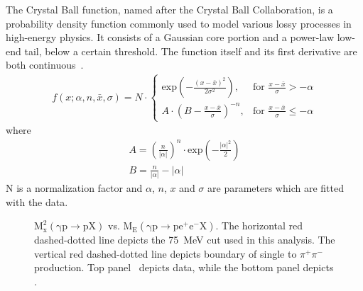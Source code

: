 The Crystal Ball function, named after the Crystal Ball Collaboration, is a probability density function commonly used to model various lossy processes in high-energy physics. It consists of a Gaussian core portion and a power-law low-end tail, below a certain threshold. The function itself and its first derivative are both continuous~\cite{CBjlab}. 
\begin{align}
f(x;\alpha,n,\bar{x},\sigma)=N\cdot
\begin{cases}
\mathrm{exp}(-\frac{(x-\bar{x})^2}{2 \sigma^2}), & \text{for }\frac{x-\bar{x}}{\sigma}>-\alpha \\
A \cdot (B - \frac{x-\bar{x}}{\sigma})^{-n}, & \text{for }\frac{x-\bar{x}}{\sigma} \le -\alpha
\end{cases}
\end{align}
where
\begin{align}
A = \left( \frac{n}{\left| \alpha \right|}\right)^n \cdot \mathrm{exp} \left( - \frac{\left| \alpha \right|^2}{2}\right) \nonumber  \\
B=\frac{n}{\left| \alpha \right|} - \left| \alpha \right|
\end{align}
N is a normalization factor and $\alpha$, $n$, $x$ and $\sigma$ are parameters which are fitted with the data.
\begin{figure}[h!]\begin{center}
		
		\caption[$\mathrm{M_x^2(\gamma p \to p X)}$ vs. $\mathrm{M_E(\gamma p \to pe^+e^- X)}$]{\label{kinefit.mm2p.mE.data.MC}$\mathrm{M_x^2(\gamma p \to p X)}$ vs. $\mathrm{M_E(\gamma p \to pe^+e^- X)}$. The horizontal red dashed-dotted line depicts the 75~MeV cut used in this analysis. The vertical red dashed-dotted line depicts boundary of single \pizT to $\pi^+\pi^-$  production. Top panel~ depicts data, while the bottom panel  depicts .}
		
	\end{center}\end{figure}
